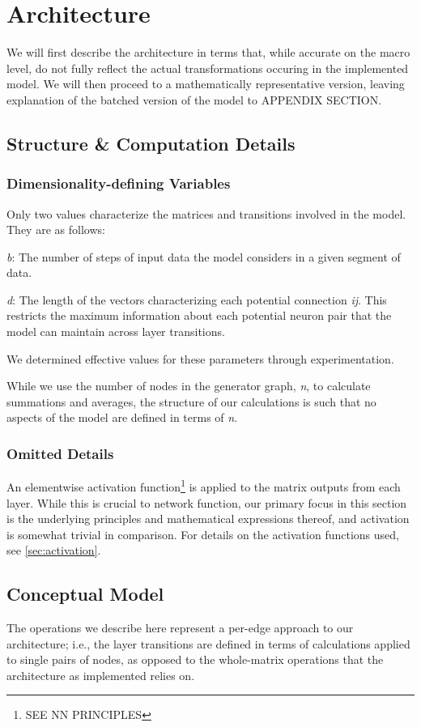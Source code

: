 \section{Architecture}
We will first describe the architecture in terms that, while accurate on the 
macro level, do not fully reflect the actual transformations occuring in the 
implemented model. We will then proceed to a mathematically representative 
version, leaving explanation of the batched version of the model to APPENDIX 
SECTION.

\subsection{Structure \& Computation Details}
\subsubsection{Dimensionality-defining Variables}
Only two values characterize the matrices and transitions involved in the model.  
They are as follows:
\begin{description}
	\item \textit{b}: The number of steps of input data the model considers in a 
		given segment of data.
	\item \textit{d}: The length of the vectors characterizing each potential 
		connection \textit{ij}. This restricts the maximum information about 
		each potential neuron pair that the model can maintain across layer 
		transitions.
\end{description}
We determined effective values for these parameters through experimentation.

While we use the number of nodes in the generator graph, \textit{n}, to 
calculate summations and averages, the structure of our calculations is such 
that no aspects of the model are defined in terms of \textit{n}.

\subsubsection{Omitted Details}
An elementwise activation function\footnote{SEE NN PRINCIPLES} is applied to the 
matrix outputs from each layer. While this is crucial to network function, our 
primary focus in this section is the underlying principles and mathematical 
expressions thereof, and activation is somewhat trivial in comparison. For 
details on the activation functions used, see \ref{sec:activation}.

\subsection{Conceptual Model}
\label{subsec:conceptualmodel}
The operations we describe here represent a per-edge approach to our 
architecture; i.e., the layer transitions are defined in terms of calculations 
applied to single pairs of nodes, as opposed to the whole-matrix operations that 
the architecture as implemented relies on.

